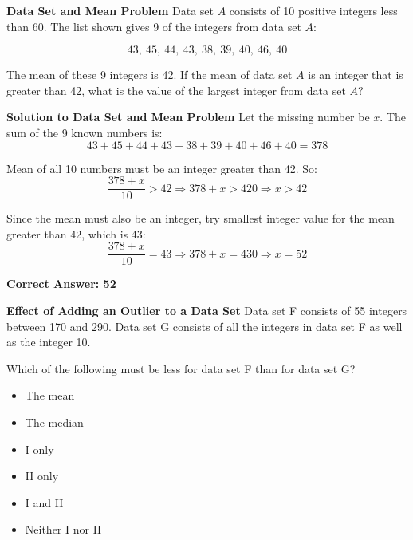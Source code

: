 \documentclass{beamer}
\begin{document}
\begin{frame}{\textbf{Data Set and Mean Problem}}
Data set \( A \) consists of 10 positive integers less than 60. The list shown gives 9 of the integers from data set \( A \):

\[
43,\ 45,\ 44,\ 43,\ 38,\ 39,\ 40,\ 46,\ 40
\]

The mean of these 9 integers is 42. If the mean of data set \( A \) is an integer that is greater than 42, what is the value of the largest integer from data set \( A \)?
\end{frame}


\begin{frame}{\textbf{Solution to Data Set and Mean Problem}}
Let the missing number be \( x \). The sum of the 9 known numbers is:
\[
43 + 45 + 44 + 43 + 38 + 39 + 40 + 46 + 40 = 378
\]

Mean of all 10 numbers must be an integer greater than 42. So:
\[
\frac{378 + x}{10} > 42 \Rightarrow 378 + x > 420 \Rightarrow x > 42
\]

Since the mean must also be an integer, try smallest integer value for the mean greater than 42, which is 43:
\[
\frac{378 + x}{10} = 43 \Rightarrow 378 + x = 430 \Rightarrow x = 52
\]

\textbf{Correct Answer: 52}
\end{frame}

\begin{frame}{\textbf{Effect of Adding an Outlier to a Data Set}}
Data set F consists of 55 integers between 170 and 290. Data set G consists of all the integers in data set F as well as the integer 10. 

Which of the following must be less for data set F than for data set G?

\begin{itemize}
    \item[I.] The mean
    \item[II.] The median
\end{itemize}

\begin{itemize}
    \item[A.] I only
    \item[B.] II only
    \item[C.] I and II
    \item[D.] Neither I nor II
\end{itemize}
\end{frame}
\end{document}
